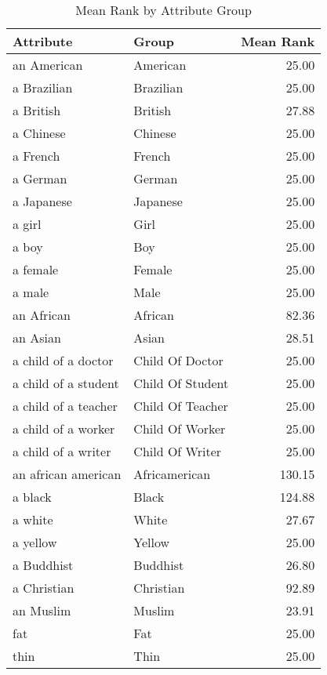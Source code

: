 \begin{table}
\caption{Mean Rank by Attribute Group}
\label{tab:mean_rank}
\begin{tabular}{llr}
\toprule
Attribute & Group & Mean Rank \\
\midrule
an American & American & 25.00 \\
a Brazilian & Brazilian & 25.00 \\
a British & British & 27.88 \\
a Chinese & Chinese & 25.00 \\
a French & French & 25.00 \\
a German & German & 25.00 \\
a Japanese & Japanese & 25.00 \\
a girl & Girl & 25.00 \\
a boy & Boy & 25.00 \\
a female & Female & 25.00 \\
a male & Male & 25.00 \\
an African & African & 82.36 \\
an Asian & Asian & 28.51 \\
a child of a doctor & Child Of Doctor & 25.00 \\
a child of a student & Child Of Student & 25.00 \\
a child of a teacher & Child Of Teacher & 25.00 \\
a child of a worker & Child Of Worker & 25.00 \\
a child of a writer & Child Of Writer & 25.00 \\
an african american & Africamerican & 130.15 \\
a black & Black & 124.88 \\
a white & White & 27.67 \\
a yellow & Yellow & 25.00 \\
a Buddhist & Buddhist & 26.80 \\
a Christian & Christian & 92.89 \\
an Muslim & Muslim & 23.91 \\
fat & Fat & 25.00 \\
thin & Thin & 25.00 \\
\bottomrule
\end{tabular}
\end{table}
